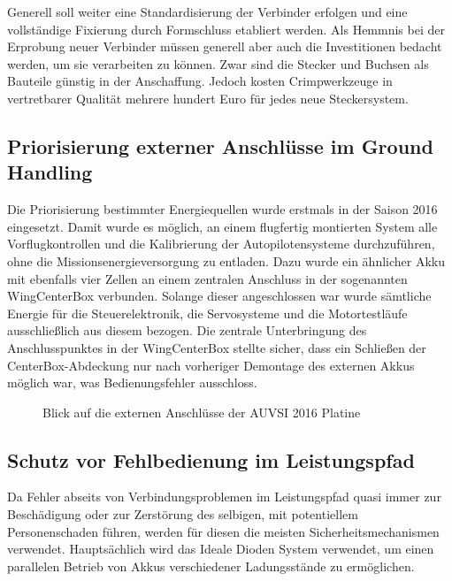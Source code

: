 \newpage

Generell soll weiter eine Standardisierung der Verbinder erfolgen und eine vollständige Fixierung durch Formschluss etabliert werden.
Als Hemmnis bei der Erprobung neuer Verbinder müssen generell aber auch die Investitionen bedacht werden, um sie verarbeiten zu können. Zwar sind die Stecker und Buchsen als Bauteile günstig in der Anschaffung. Jedoch kosten Crimpwerkzeuge in vertretbarer Qualität  mehrere hundert Euro für jedes neue Steckersystem.





\subsection{Priorisierung externer Anschlüsse im Ground Handling}

Die Priorisierung bestimmter Energiequellen wurde erstmals in der Saison 2016 eingesetzt. Damit wurde es möglich, an einem flugfertig montierten System alle Vorflugkontrollen und die Kalibrierung der Autopilotensysteme durchzuführen, ohne die Missionsenergieversorgung zu entladen. Dazu wurde ein ähnlicher Akku mit ebenfalls vier Zellen an einem zentralen Anschluss in der sogenannten WingCenterBox verbunden. Solange dieser angeschlossen war wurde sämtliche Energie für die Steuerelektronik, die Servosysteme und die Motortestläufe ausschließlich aus diesem bezogen. Die zentrale Unterbringung des Anschlusspunktes in der WingCenterBox stellte sicher, dass ein Schließen der CenterBox-Abdeckung nur nach vorheriger Demontage des externen Akkus möglich war, was Bedienungsfehler ausschloss.

\begin{figure}[H]
\centering
{}
\caption{Blick auf die externen Anschlüsse der AUVSI 2016 Platine} 
\label{fig:Blick auf die Externen Anschlüsse der AUVSI 2016 Platine}
\end{figure}


\subsection{Schutz vor Fehlbedienung im Leistungspfad}

Da Fehler abseits von Verbindungsproblemen im Leistungspfad quasi immer zur Beschädigung oder zur Zerstörung des selbigen, mit potentiellem Personenschaden führen, werden für diesen die meisten Sicherheitsmechanismen verwendet.
Hauptsächlich wird das Ideale Dioden System verwendet, um einen parallelen Betrieb von Akkus verschiedener Ladungsstände zu ermöglichen.

